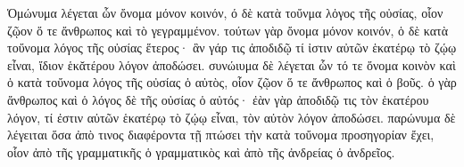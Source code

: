 


    Ὁμώνυμα λέγεται ὧν ὄνομα μόνον κοινόν, ό δὲ κατὰ τοὔνμα λὀγος τῆς οὐσίας, οἷον ζῷον ὅ τε ἄνθρωπος καὶ τὸ
    γεγραμμένον. τούτων γὰρ ὄνομα μόνον κοινόν, ὁ δὲ κατὰ τοὔνομα λόγος τῆς οὐσίας ἕτερος· ἃν γάρ τις ἀποδιδῷ
    τί ἰστιν αὐτῶν ἑκατέρῳ τὸ ζῴῳ εἶναι, ἴδιον ἑκᾰτέρου λόγον ἀποδώσει. συνώιυμα δὲ λέγεται ὧν τό τε ὅνομα κοινὸν καὶ ὁ
    κατὰ τοὔνομα λόγος τῆς οὐσίας ὁ αὐτὸς, οἷον ζῷον ὅ τε ἄνθρωπος καὶ ὁ βοῦς. ὁ γὰρ ἄνθρωπος καὶ ὁ λόγος δὲ τῆς οὐσίας
    ὁ αὐτός· ἐὰν γὰρ ἀποδιδῷ τις τὸν ἑκατέρου λόγον, τί ἐστιν αὐτῶν ἑκατέρῳ τὸ ζῴῳ εἶναι, τὸν αὐτὸν λόγον
    ἀποδώσει. παρώνυμα δὲ λέγειται ὅσα ἀπὸ τινος διαφέροντα τῇ πτώσει τὴν κατὰ τοὔνομα προσηγορίαν ἔχει, οἷον ἀπὸ τῆς
    γραμματικῆς ὁ γραμματικὸς καὶ ἀπὸ τῆς ἀνδρείας ὁ ἀνδρεῖος.

